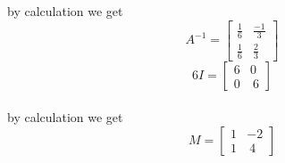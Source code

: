 \documentclass[journal,12pt,twocolumn]{IEEEtran}
\begin{document}
 by calculation we get   
 \begin{equation}
  A^{-1}=\begin{bmatrix}
      \frac{1}{6} & \frac{-1}{3}\\
    \frac{1}{6} & \frac{2}{3}
     \end{bmatrix}
  \end{equation}
  \begin{equation}
 6I=\begin{bmatrix}
       6&0 \\
    0 & \ 6
     \end{bmatrix}
       \end{equation}\\
 by calculation we get 
 \begin{equation}
 M=\begin{bmatrix}
       1&-2 \\
    1 & \ 4
     \end{bmatrix}
     \end{equation}
\end{document}

